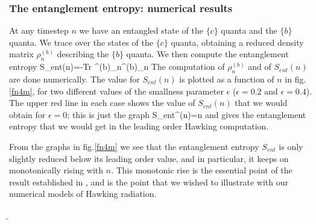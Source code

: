 \documentclass[12pt]{article}
\begin{document}
\subsubsection{The entanglement entropy: numerical results}

At any timestep $n$ we have an entangled state of the $\{c\}$ quanta and the $\{ b\} $ quanta. We trace over the states of the $\{ c\}$ quanta, obtaining a reduced density matrix $\rho^{(b)}_n$ describing the $\{ b \}$ quanta. We then compute the entanglement entropy
\be
S_{ent}(n)=-Tr \rho^{(b)}_n\ln \rho^{(b)}_n
\ee
The computation of $\rho^{(b)}_n$ and of $S_{ent}(n)$ are done numerically. The value for $S_{ent}(n)$ is plotted as a function of $n$ in fig.\ref{fn4m}, for two different values of the smallness parameter $\epsilon$ ($\epsilon=0.2$ and $\epsilon=0.4$).   The upper red line in each case shows the value of $S_{ent}(n)$ that we would obtain for $\epsilon=0$; this is just the graph
\be
S_{ent}^{}(n)=n
\ee
and gives the entanglement entropy that we would get in the leading order Hawking computation. 

From the graphs in fig.\ref{fn4m} we see that the entanglement entropy $S_{ent}$ is only slightly reduced below its leading order value, and in particular, it keeps on monotonically rising with $n$. This monotonic rise is the essential point of the  result established in \cite{mathurfuzz}, and is the point that we wished to illustrate with our numerical models of Hawking radiation.


\b
\end{document}
